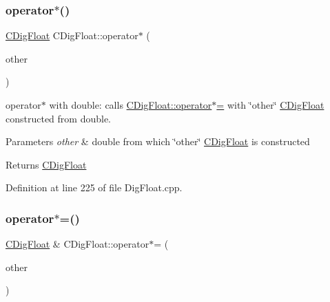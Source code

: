 \mbox{\label{classCDigFloat_aa699c4362ad8acfcd1649f93d805e105}} 
\subsubsection{\texorpdfstring{operator$\ast$()}{operator*()}\hspace{0.1cm}{\footnotesize\ttfamily [2/2]}}
{\footnotesize\ttfamily \hyperlink{classCDigFloat}{C\+Dig\+Float} C\+Dig\+Float\+::operator$\ast$ (\begin{DoxyParamCaption}\item[{const double}]{other }\end{DoxyParamCaption})}



operator$\ast$ with double\+: calls \hyperlink{classCDigFloat_a9535d47a31a3f1cfa487cc8c567a4a12}{C\+Dig\+Float\+::operator$\ast$=} with \char`\"{}other\char`\"{} \hyperlink{classCDigFloat}{C\+Dig\+Float} constructed from double. 


\begin{DoxyParams}{Parameters}
{\em other} & double from which \char`\"{}other\char`\"{} \hyperlink{classCDigFloat}{C\+Dig\+Float} is constructed \\
\hline
\end{DoxyParams}
\begin{DoxyReturn}{Returns}
\hyperlink{classCDigFloat}{C\+Dig\+Float} 
\end{DoxyReturn}


Definition at line 225 of file Dig\+Float.\+cpp.

\mbox{\label{classCDigFloat_a9535d47a31a3f1cfa487cc8c567a4a12}} 
\subsubsection{\texorpdfstring{operator$\ast$=()}{operator*=()}\hspace{0.1cm}{\footnotesize\ttfamily [1/2]}}
{\footnotesize\ttfamily \hyperlink{classCDigFloat}{C\+Dig\+Float} \& C\+Dig\+Float\+::operator$\ast$= (\begin{DoxyParamCaption}\item[{const \hyperlink{classCDigFloat}{C\+Dig\+Float} \&}]{other }\end{DoxyParamCaption})}



